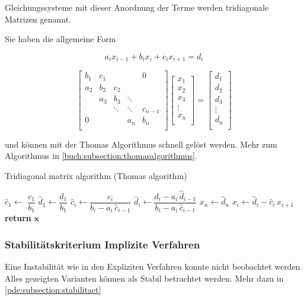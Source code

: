 Gleichungssysteme mit dieser Anordnung der Terme werden tridiagonale Matrizen genannt.

Sie haben die allgemeine Form

  \begin{equation}
    a_{i}x_{{i-1}}+b_{i}x_{i}+c_{i}x_{{i+1}}=d_{i}
  \end{equation}


  \begin{equation}
    \begin{bmatrix}{b_{1}}&{c_{1}}&{}&{}&{0}\\
      {a_{2}}&{b_{2}}&{c_{2}}&{}&{}\\
      {}&{a_{3}}&{b_{3}}&\ddots &{}\\
      {}&{}&\ddots &\ddots &{c_{n-1}}\\
      {0}&{}&{}&{a_{n}}&{b_{n}}\\
      \end{bmatrix}
      \begin{bmatrix}{x_{1}}\\
      {x_{2}}\\{x_{3}}\\\vdots \\
      {x_{n}}\\
      \end{bmatrix}
      =
      \begin{bmatrix}{d_{1}}\\
      {d_{2}}\\{d_{3}}\\
      \vdots \\{d_{n}}\\
    \end{bmatrix}
  \end{equation}
  
   und k\"onnen mit der Thomas Algorithmus schnell gel\"ost werden.
   Mehr zum Algorithmus in \ref{buch:subsection:thomasalgorithmus}.


\begin{algorithm}\caption{Tridiagonal matrix algorithm (Thomas algorithm)}\label{TDMA}
  \setlength{\lineskip}{7pt}
  \begin{algorithmic}[1]
      \State $\hat c_1 \gets$ $ \dfrac{c_1}{b_1}$
      \State $\hat d_1 \gets \dfrac{d_1}{b_1}$
        \State $\hat c_i \gets \dfrac{c_i}{b_i-a_i \, \hat c_{i-1}}$
        \State $\hat d_i \gets \dfrac{d_i - a_i \, \hat d_{i-1}}{b_i-a_i \, \hat c_{i-1}}$
      \EndFor
      \State $x_n \gets \hat d_n$
        \State $x_i \gets \hat d_i - \hat c_i \, x_{i+1}$
      \EndFor
      \State \textbf{return} $\textbf{x}$
    \EndFunction
  \end{algorithmic}
\end{algorithm}

\subsubsection{Stabilit\"atskriterium Implizite Verfahren}

Eine Instabilit\"at wie in den Expliziten Verfahren konnte nicht beobachtet werden.
Alles gezeigten Varianten k\"onnen als Stabil betrachtet werden.
Mehr dazu in \ref{pde:subsection:stabilitaet}
